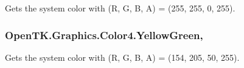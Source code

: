 Gets the system color with (R, G, B, A) = (255, 255, 0, 255). 

\hypertarget{struct_open_t_k_1_1_graphics_1_1_color4_ab1492df21efd225dbaa03f1dfed89d39}{
\subsubsection[{Yellow\-Green}]{ Open\-T\-K.\-Graphics.\-Color4.\-Yellow\-Green\hspace{0.3cm}{\ttfamily [static]}, {\ttfamily [get]}}}\label{struct_open_t_k_1_1_graphics_1_1_color4_ab1492df21efd225dbaa03f1dfed89d39}


Gets the system color with (R, G, B, A) = (154, 205, 50, 255). 

